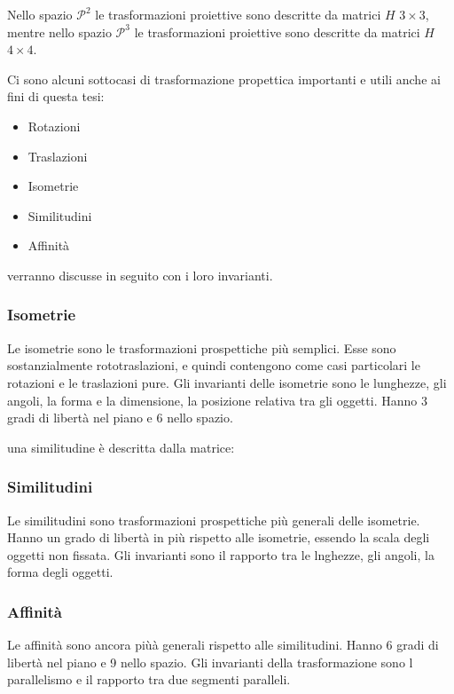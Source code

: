 Nello spazio $\mathcal{P}^2$ le trasformazioni proiettive sono descritte da matrici $H$ $3\times3$, mentre nello spazio $\mathcal{P}^3$ le trasformazioni proiettive sono descritte da matrici $H$ $4\times4$.

Ci sono alcuni sottocasi di trasformazione propettica importanti e utili anche ai fini di questa tesi:

\begin{itemize}
 \item Rotazioni
 \item Traslazioni
 \item Isometrie
 \item Similitudini
 \item Affinità
\end{itemize}

verranno discusse in seguito con i loro invarianti.

\subsubsection{Isometrie}

Le isometrie sono le trasformazioni prospettiche più semplici. Esse sono sostanzialmente rototraslazioni, e quindi contengono come casi particolari le rotazioni e le traslazioni pure. Gli invarianti delle isometrie sono le lunghezze, gli angoli, la forma e la dimensione, la posizione relativa tra gli oggetti. Hanno 3 gradi di libertà nel piano e 6 nello spazio.

una similitudine è descritta dalla matrice:


\subsubsection{Similitudini}
Le similitudini sono trasformazioni prospettiche più generali delle isometrie. Hanno un grado di libertà in più rispetto alle isometrie, essendo la scala degli oggetti non fissata. Gli invarianti sono il rapporto tra le lnghezze, gli angoli, la forma degli oggetti.


\subsubsection{Affinità}
Le affinità sono ancora piùà generali rispetto alle similitudini. Hanno 6 gradi di libertà nel piano e 9 nello spazio. Gli invarianti della trasformazione sono l parallelismo e il rapporto tra due segmenti paralleli.

